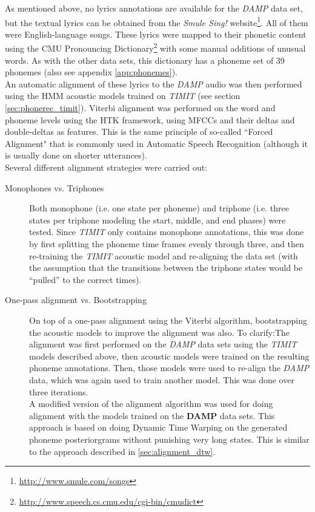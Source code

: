 As mentioned above, no lyrics annotations are available for the \textit{DAMP} data set, but the textual lyrics can be obtained from the \textit{Smule Sing!} website\footnote{\url{http://www.smule.com/songs}}.  All of them were English-language songs. These lyrics were mapped to their phonetic content using the CMU Pronouncing Dictionary\footnote{\url{http://www.speech.cs.cmu.edu/cgi-bin/cmudict}} with some manual additions of unusual words. As with the other data sets, this dictionary has a phoneme set of 39 phonemes (also see appendix \ref{app:phonemes}).\\
An automatic alignment of these lyrics to the \textit{DAMP} audio was then performed using the HMM acoustic models trained on \textit{TIMIT} (see section \ref{sec:phonerec_timit}). Viterbi alignment was performed on the word and phoneme levels using the HTK framework, using MFCCs and their deltas and double-deltas as features. This is the same principle of so-called ``Forced Alignment" that is commonly used in Automatic Speech Recognition \cite{book:jurafsky} (although it is usually done on shorter utterances). \\
Several different alignment strategies were carried out:
\begin{description}

\item[Monophones vs. Triphones] Both monophone (i.e. one state per phoneme) and triphone (i.e. three states per triphone modeling the start, middle, and end phases) were tested. Since \textit{TIMIT} only contains monophone annotations, this was done by first splitting the phoneme time frames evenly through three, and then re-training the \textit{TIMIT} acoustic model and re-aligning the data set (with the assumption that the transitions between the triphone states would be ``pulled'' to the correct times).  
\item[One-pass alignment vs. Bootstrapping] On top of a one-pass alignment using the Viterbi algorithm, bootstrapping the acoustic models to improve the alignment was also. To clarify:The alignment was first performed on the \textit{DAMP} data sets using the \textit{TIMIT} models described above, then acoustic models were trained on the resulting phoneme annotations. Then, those models were used to re-align the \textit{DAMP} data, which was again used to train another model. This was done over three iterations.\\
A modified version of the alignment algorithm was used for doing alignment with the models trained on the \textbf{DAMP} data sets. This approach is based on doing Dynamic Time Warping on the generated phoneme posteriorgrams without punishing very long states. This is similar to the approach described in \ref{sec:alignment_dtw}.
\end{description}
